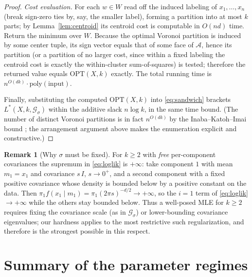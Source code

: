 \documentclass{amsart}
\theoremstyle{plain}
\theoremstyle{definition}
\newtheorem{remark}{Remark}
\begin{document}
\begin{proof}
\emph{Cost evaluation.} For each $w\in W$ read off the induced labeling of
$x_{1},\dots,x_{n}$ (break sign-zero ties by, say, the smaller label), forming a
partition into at most $k$ parts; by Lemma~\ref{lem:centroid} its centroid cost is
computable in $O(nd)$ time. Return the minimum over $W$. Because the optimal
Voronoi partition is induced by some center tuple, its sign vector equals that of
some face of $\mathcal A$, hence its partition (or a partition of no larger cost,
since within a fixed labeling the centroid cost is exactly the within-cluster
sum-of-squares) is tested; therefore the returned value equals
$\mathrm{OPT}(X,k)$ exactly. The total running time is
$n^{O(dk)}\cdot\mathrm{poly}(\text{input})$.

Finally, substituting the computed $\mathrm{OPT}(X,k)$ into \eqref{eq:sandwich}
brackets $L^{\ast}(X,k,\mathcal G_{\sigma})$ within the additive slack $n\log k$,
in the same time bound. (The number of distinct Voronoi partitions is in fact
$n^{O(dk)}$ by the Inaba--Katoh--Imai bound \cite{IKI}; the arrangement argument
above makes the enumeration explicit and constructive.)
\end{proof}

\begin{remark}[Why $\sigma$ must be fixed]\label{rem:degen}
For $k\ge2$ with \emph{free} per-component covariances the supremum in
\eqref{eq:loglik} is $+\infty$: take component $1$ with mean $m_{1}=x_{1}$ and
covariance $s\,I$, $s\to0^{+}$, and a second component with a fixed positive
covariance whose density is bounded below by a positive constant on the data.
Then $\pi_{1}f(x_{1}\mid m_{1})=\pi_{1}(2\pi s)^{-d/2}\to+\infty$, so the
$i=1$ term of \eqref{eq:loglik} $\to+\infty$ while the others stay bounded below.
Thus a well-posed MLE for $k\ge2$ requires fixing the covariance scale (as in
$\mathcal G_{\sigma}$) or lower-bounding covariance eigenvalues; our hardness
applies to the most restrictive such regularization, and therefore is the
strongest possible in this respect.
\end{remark}

\section{Summary of the parameter regimes}
\end{document}
